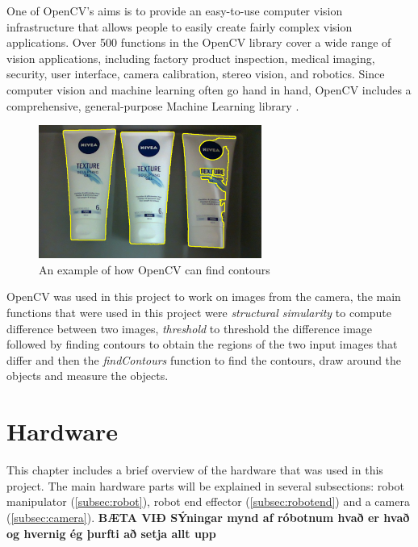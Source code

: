 One of OpenCV's aims is to provide an easy-to-use computer vision infrastructure that allows people to easily create fairly complex vision applications. Over 500 functions in the OpenCV library cover a wide range of vision applications, including factory product inspection, medical imaging, security, user interface, camera calibration, stereo vision, and robotics. Since computer vision and machine learning often go hand in hand, OpenCV includes a comprehensive, general-purpose Machine Learning library \cite{kaehler_what_2016}.

\begin{figure}[h]
    \centering
    \includegraphics[width=0.65\textwidth]{graphics/contour.PNG}
    \caption{An example of how OpenCV can find contours}
    \label{fig:my_label}
\end{figure}

OpenCV was used in this project to work on images from the camera, the main functions that were used in this project were \textit{structural simularity} to compute difference between two images,  \textit{threshold} to threshold the difference image followed by finding contours to obtain the regions of the two input images that differ and then the \textit{findContours} function to find the contours, draw around the objects and measure the objects.


\section{Hardware \label{sec:hardware}}
This chapter includes a brief overview of the hardware that was used in this project. The main hardware parts will be explained in several subsections: robot manipulator (\ref{subsec:robot}), robot end effector (\ref{subsec:robotend}) and a camera (\ref{subsec:camera}). 
\textbf{BÆTA VIÐ SÝningar mynd af róbotnum hvað er hvað og hvernig ég þurfti að setja allt upp}
